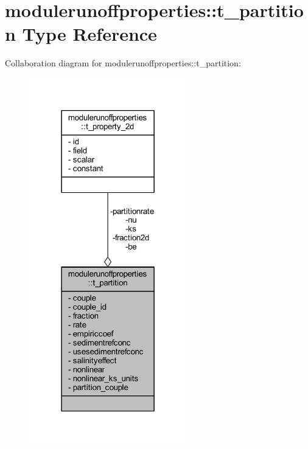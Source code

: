 \hypertarget{structmodulerunoffproperties_1_1t__partition}{}\section{modulerunoffproperties\+:\+:t\+\_\+partition Type Reference}
\label{structmodulerunoffproperties_1_1t__partition}


Collaboration diagram for modulerunoffproperties\+:\+:t\+\_\+partition\+:\nopagebreak
\begin{figure}[H]
\begin{center}
\leavevmode
\includegraphics[width=195pt]{structmodulerunoffproperties_1_1t__partition__coll__graph}
\end{center}
\end{figure}
